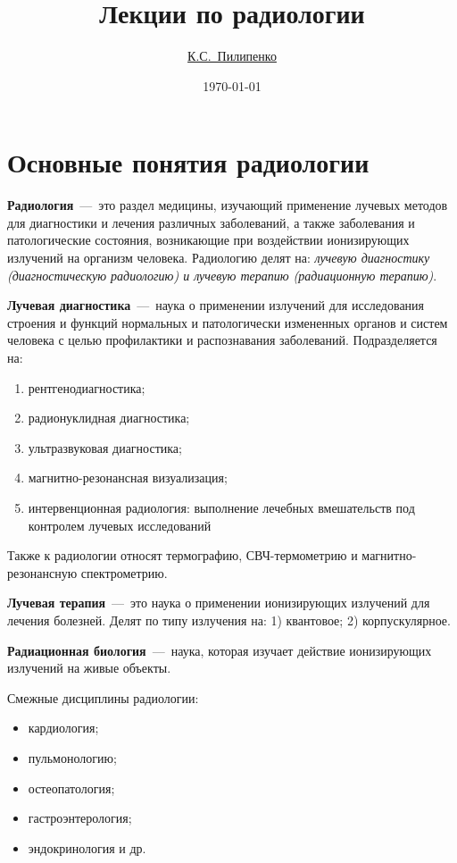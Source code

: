 \documentclass[14pt,a4paper]{article}
\title{Лекции по радиологии}
\author{\href{mailto:www-kirill.pilipenko@yandex.ru}{К.С.~Пилипенко}} %
\date{\selectlanguage{russian}\today}
\begin{document}
\maketitle
\section{Основные понятия радиологии}
\textbf{Радиология}~---~это раздел медицины, изучающий применение лучевых методов для диагностики  и лечения различных заболеваний, а также заболевания и патологические состояния, возникающие при воздействии ионизирующих излучений на организм человека.
Радиологию делят на: \textit{лучевую диагностику (диагностическую радиологию) и лучевую
терапию (радиационную терапию)}.

\textbf{Лучевая диагностика}~---~наука о применении излучений для исследования строения и функций нормальных и патологически измененных органов и систем человека с целью профилактики и распознавания заболеваний. Подразделяется на: 
\begin{enumerate}
    \item рентгенодиагностика; 
    \item радионуклидная диагностика;
    \item ультразвуковая диагностика;
    \item магнитно-резонансная визуализация;
    \item интервенционная радиология: выполнение лечебных вмешательств под контролем лучевых исследований
\end{enumerate}
Также к радиологии относят термографию, СВЧ-термометрию и магнитно-резонансную спектрометрию.

\textbf{Лучевая терапия}~---~это наука о применении ионизирующих излучений для лечения болезней. Делят по типу излучения на: 1) квантовое; 2) корпускулярное.

\textbf{Радиационная биология}~---~наука, которая изучает действие ионизирующих излучений на живые объекты.

Смежные дисциплины радиологии:
\begin{itemize}
    \item кардиология;
    \item пульмонологию; 
    \item остеопатология; 
    \item гастроэнтерология; 
    \item эндокринология и др.
\end{itemize}
\end{document}
